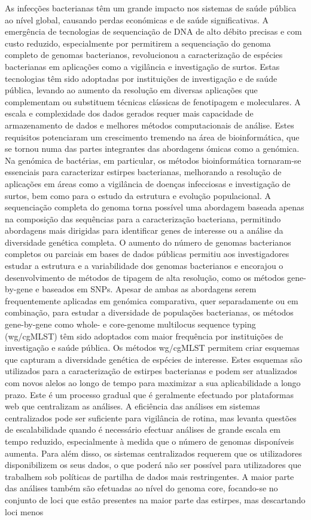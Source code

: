 


As infecções bacterianas têm um grande impacto nos sistemas de saúde pública ao nível global, causando perdas económicas e de saúde significativas. A emergência de tecnologias de sequenciação de DNA de alto débito precisas e com custo reduzido, especialmente por permitirem a sequenciação do genoma completo de genomas bacterianos, revolucionou a caracterização de espécies bacterianas em aplicações como a vigilância e investigação de surtos. Estas tecnologias têm sido adoptadas por instituições de investigação e de saúde pública, levando ao aumento da resolução em diversas aplicações que complementam ou substituem técnicas clássicas de fenotipagem e moleculares. A escala e complexidade dos dados gerados requer mais capacidade de armazenamento de dados e melhores métodos computacionais de análise. Estes requisitos potenciaram um crescimento tremendo na área de bioinformática, que se tornou numa das partes integrantes das abordagens ómicas como a genómica. Na genómica de bactérias, em particular, os métodos bioinformática tornaram-se essenciais para caracterizar estirpes bacterianas, melhorando a resolução de aplicações em áreas como a vigilância de doenças infecciosas e investigação de surtos, bem como para o estudo da estrutura e evolução populacional. A sequenciação completa do genoma torna possível uma abordagem baseada apenas na composição das sequências para a caracterização bacteriana, permitindo abordagens mais dirigidas para identificar genes de interesse ou a análise da diversidade genética completa. O aumento do número de genomas bacterianos completos ou parciais em bases de dados públicas permitiu aos investigadores estudar a estrutura e a variabilidade dos genomas bacterianos e encorajou o desenvolvimento de métodos de tipagem de alta resolução, como os métodos gene-by-gene e baseados em SNPs. Apesar de ambas as abordagens serem frequentemente aplicadas em genómica comparativa, quer separadamente ou em combinação, para estudar a diversidade de populações bacterianas, os métodos gene-by-gene como whole- e core-genome multilocus sequence typing (wg/cgMLST) têm sido adoptados com maior frequência por instituições de investigação e saúde pública. Os métodos wg/cgMLST permitem criar esquemas que capturam a diversidade genética de espécies de interesse. Estes esquemas são utilizados para a caracterização de estirpes bacterianas e podem ser atualizados com novos alelos ao longo de tempo para maximizar a sua aplicabilidade a longo prazo. Este é um processo gradual que é geralmente efectuado por plataformas web que centralizam as análises. A eficiência das análises em sistemas centralizados pode ser suficiente para vigilância de rotina, mas levanta questões de escalabilidade quando é necessário efectuar análises de grande escala em tempo reduzido, especialmente à medida que o número de genomas disponíveis aumenta. Para além disso, os sistemas centralizados requerem que os utilizadores disponibilizem os seus dados, o que poderá não ser possível para utilizadores que trabalhem sob políticas de partilha de dados mais restringentes. A maior parte das análises também são efetuadas ao nível do genoma core, focando-se no conjunto de loci que estão presentes na maior parte das estirpes, mas descartando loci menos 